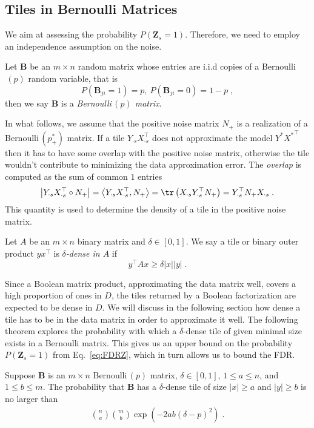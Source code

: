 \subsection{Tiles in Bernoulli Matrices}
We aim at assessing the probability $P(\mathbf{Z}_s=1)$. Therefore, we need to employ an independence assumption on the noise. 
\begin{definition}
Let $\mathbf{B}$ be an $m\times n$ random matrix whose entries are i.i.d copies of a Bernoulli$\,(p)$ random variable, that is
\[P(\mathbf{B}_{ji}=1)=p,\ P(\mathbf{B}_{ji}=0)=1-p\;,\]
then we say $\mathbf{B}$ is a \emph{Bernoulli$\,(p)$ matrix}.
\end{definition}
In what follows, we assume that the positive noise matrix $N_+$ is a realization of a Bernoulli$\,(p_+^*)$ matrix. If a tile $Y_{\cdot s}X_{\cdot s}^\top$ does not approximate the model $Y^*{X^*}^\top$ then it has to have some overlap with the positive noise matrix, otherwise the tile wouldn't contribute to minimizing the data approximation error. The \emph{overlap} is computed as the sum of common $1$ entries
\[\bigl\lvert Y_{\cdot s}X_{\cdot s}^\top\circ N_+\bigr\rvert=\bigl\langle Y_{\cdot s}X_{\cdot s}^\top,N_+\bigr\rangle=\tr\left(X_{\cdot s}Y_{\cdot s}^\top N_+\right)=Y_{\cdot s}^\top N_+X_{\cdot s}\;.\]
This quantity is used to determine the density of a tile in the positive noise matrix.
\begin{definition}
Let $A$ be an $m\times n$ binary matrix and $\delta\in[0,1]$. We say a tile or binary outer product $yx^\top$ is \emph{$\delta$-dense in $A$}  if
\[y^\top A x \geq \delta \lvert x\rvert\lvert y\rvert \;.\]
\end{definition}
Since a Boolean matrix product, approximating the data matrix well, covers a high proportion of ones in $D$, the tiles returned by a Boolean factorization are expected to be dense in $D$. We will discuss in the following section how dense a tile has to be in the data matrix in order to approximate it well. The following theorem explores the probability with which a $\delta$-dense tile of given minimal size exists in a Bernoulli matrix. This gives us an upper bound on the probability $P(\mathbf{Z}_s=1)$ from Eq.~\eqref{eq:FDRZ}, which in turn allows us to bound the FDR.
\begin{theorem}\label{thm:densProb}
Suppose $\mathbf{B}$ is an $m\times n$ Bernoulli$\,(p)$ matrix, $\delta\in[0,1]$, $1\leq a\leq n$, and $1\leq b\leq m$. 
The probability that $\mathbf{B}$ has a $\delta$-dense tile of size $\lvert x\rvert \geq a$ and $\lvert y\rvert \geq b$ is no larger than
\begin{align}\label{eq:densBound}
\binom{n}{a}\binom{m}{b}\exp\left(-2ab(\delta-p)^2\right)\;.
\end{align}
\end{theorem}
